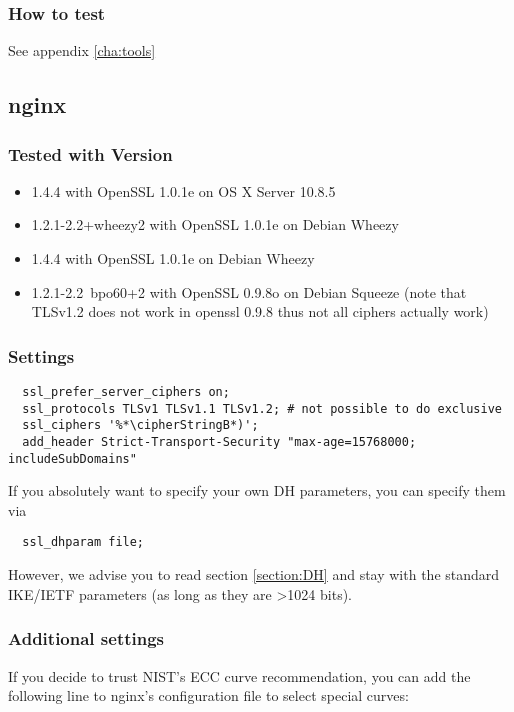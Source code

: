 \subsubsection{How to test} 
See appendix \ref{cha:tools}


\subsection{nginx}


\subsubsection{Tested with Version} 
\begin{itemize}
  \item 1.4.4 with OpenSSL 1.0.1e on OS X Server 10.8.5
  \item 1.2.1-2.2+wheezy2 with OpenSSL 1.0.1e on Debian Wheezy
  \item 1.4.4 with OpenSSL 1.0.1e on Debian Wheezy
  \item 1.2.1-2.2~bpo60+2 with OpenSSL 0.9.8o on Debian Squeeze (note that TLSv1.2 does not work in openssl 0.9.8 thus not all ciphers actually work)
\end{itemize}


\subsubsection{Settings}
\begin{lstlisting}
  ssl_prefer_server_ciphers on;
  ssl_protocols TLSv1 TLSv1.1 TLSv1.2; # not possible to do exclusive
  ssl_ciphers '%*\cipherStringB*)';
  add_header Strict-Transport-Security "max-age=15768000; includeSubDomains"
\end{lstlisting}

If you absolutely want to specify your own DH parameters, you can specify them via
\begin{lstlisting}
  ssl_dhparam file;
\end{lstlisting}

However, we advise you to read section \ref{section:DH} and stay with the standard IKE/IETF parameters (as long as they are \textgreater 1024 bits).


\subsubsection{Additional settings}
If you decide to trust NIST's ECC curve recommendation, you can add the following line to nginx's configuration file to select special curves:

